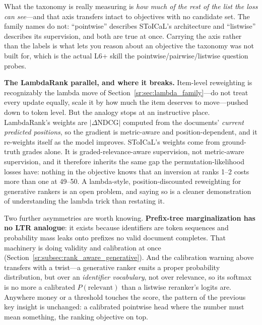 \begin{keyinsight}
What the taxonomy is really measuring is \textit{how much of the rest of the list the loss can see}---and that axis transfers intact to objectives with no candidate set. The family names do not: ``pointwise'' describes SToICaL's architecture and ``listwise'' describes its supervision, and both are true at once. Carrying the axis rather than the labels is what lets you reason about an objective the taxonomy was not built for, which is the actual L6+ skill the pointwise/pairwise/listwise question probes.
\end{keyinsight}

\textbf{The LambdaRank parallel, and where it breaks.} Item-level reweighting is recognizably the lambda move of Section~\ref{sr:sec:lambda_family}---do not treat every update equally, scale it by how much the item deserves to move---pushed down to token level. But the analogy stops at an instructive place. LambdaRank's weights are $|\Delta\text{NDCG}|$ computed from the documents' \textit{current predicted positions}, so the gradient is metric-aware and position-dependent, and it re-weights itself as the model improves. SToICaL's weights come from ground-truth grades alone. It is graded-relevance-aware supervision, not metric-aware supervision, and it therefore inherits the same gap the permutation-likelihood losses have: nothing in the objective knows that an inversion at ranks 1--2 costs more than one at 49--50. A lambda-style, position-discounted reweighting for generative rankers is an open problem, and saying so is a cleaner demonstration of understanding the lambda trick than restating it.

Two further asymmetries are worth knowing. \textbf{Prefix-tree marginalization has no LTR analogue}: it exists because identifiers are token sequences and probability mass leaks onto prefixes no valid document completes. That machinery is doing validity and calibration at once (Section~\ref{sr:subsec:rank_aware_generative}). And the calibration warning above transfers with a twist---a generative ranker emits a proper probability distribution, but over an \textit{identifier vocabulary}, not over relevance, so its softmax is no more a calibrated $P(\text{relevant})$ than a listwise reranker's logits are. Anywhere money or a threshold touches the score, the pattern of the previous key insight is unchanged: a calibrated pointwise head where the number must mean something, the ranking objective on top.

